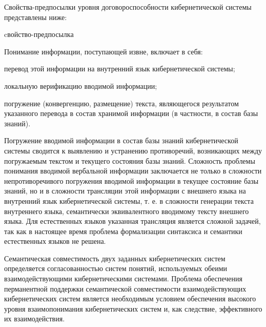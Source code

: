 Свойства-предпосылки уровня договороспособности кибернетической системы представлены ниже:

\begin{SCn}
\begin{scnrelfromlist}{cвойство-предпосылка}
\end{scnrelfromlist}
\end{SCn}

Понимание информации, поступающей извне, включает в себя:
\begin{textitemize}
    \item перевод этой информации на внутренний язык кибернетической системы;
    \item локальную верификацию вводимой информации;
    \item погружение (конвергенцию, размещение) текста, являющегося результатом указанного перевода в состав хранимой информации (в частности, в состав базы знаний).
\end{textitemize}

Погружение вводимой информации в состав базы знаний кибернетической системы сводится к выявлению и устранению противоречий, возникающих между погружаемым текстом и текущего состояния базы знаний.
Сложность проблемы понимания вводимой вербальной информации заключается не только в сложности непротиворечивого погружения вводимой информации в текущее состояние базы знаний, но и в сложности трансляции этой информации с внешнего языка на внутренний язык кибернетической системы, т. е. в сложности генерации текста внутреннего языка, семантически эквивалентного вводимому тексту внешнего языка.
Для естественных языков указанная трансляция является сложной задачей, так как в настоящее время проблема формализации синтаксиса и семантики естественных языков не решена.

Семантическая совместимость двух заданных кибернетических систем определяется согласованностью систем понятий, используемых обеими взаимодействующими кибернетическими системами.
Проблема обеспечения перманентной поддержки семантической совместимости взаимодействующих кибернетических систем является необходимым условием обеспечения высокого уровня взаимопонимания кибернетических систем и, как следствие, эффективного их взаимодействия.

